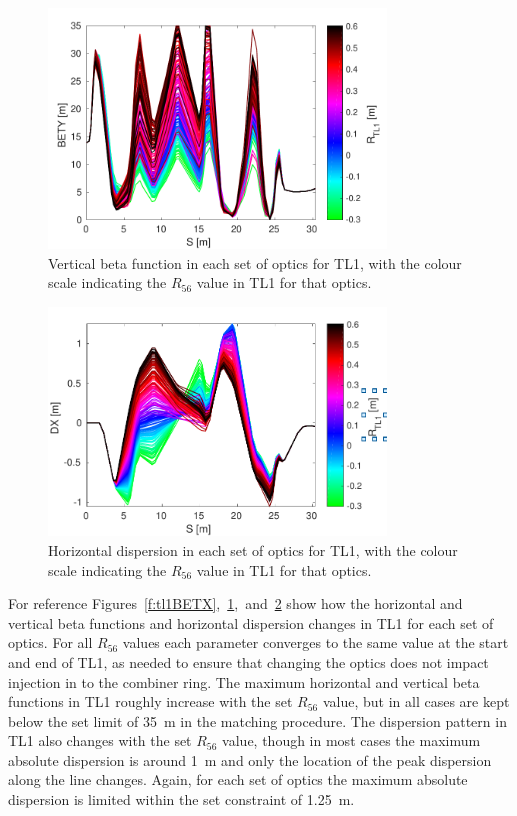 \begin{figure}
  \centering
  \includegraphics[width=0.8\textwidth]{Figures/propagation/BETY}
  \caption{Vertical beta function in each set of optics for TL1, with the colour scale indicating the \(R_{56}\) value in TL1 for that optics.}
  \label{f:tl1BETY}
\end{figure}

\begin{figure}
  \centering
  \includegraphics[width=0.8\textwidth]{Figures/propagation/DX}
  \caption{Horizontal dispersion in each set of optics for TL1, with the colour scale indicating the \(R_{56}\) value in TL1 for that optics.}
  \label{f:tl1DX}
\end{figure}

For reference Figures~\ref{f:tl1BETX},~\ref{f:tl1BETY},~and~\ref{f:tl1DX} show how the horizontal and vertical beta functions and horizontal dispersion changes in TL1 for each set of optics. For all \(R_{56}\) values each parameter converges to the same value at the start and end of TL1, as needed to ensure that changing the optics does not impact injection in to the combiner ring. The maximum horizontal and vertical beta functions in TL1 roughly increase with the set \(R_{56}\) value, but in all cases are kept below the set limit of 35~m in the matching procedure. The dispersion pattern in TL1 also changes with the set \(R_{56}\) value, though in most cases the maximum absolute dispersion is around 1~m and only the location of the peak dispersion along the line changes. Again, for each set of optics the maximum absolute dispersion is limited within the set constraint of 1.25~m. 


